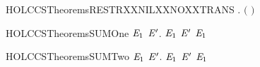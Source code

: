 \newcommand{\HOLCCSTheoremsRESTRXXLABELXXNOXXTRANS}{\UseVerbatim{HOLCCSTheoremsRESTRXXLABELXXNOXXTRANS}}
\begin{SaveVerbatim}{HOLCCSTheoremsRESTRXXNILXXNOXXTRANS}
\HOLTokenTurnstile{} \HOLSymConst{\HOLTokenForall{}}  . \HOLSymConst{\HOLTokenNeg{}}\ensuremath{(}   \HOLTokenTransBegin{}\HOLTokenTransEnd {}\ensuremath{)}
\end{SaveVerbatim}
\newcommand{\HOLCCSTheoremsRESTRXXNILXXNOXXTRANS}{\UseVerbatim{HOLCCSTheoremsRESTRXXNILXXNOXXTRANS}}
\begin{SaveVerbatim}{HOLCCSTheoremsSUMOne}
\HOLTokenTurnstile{} \HOLSymConst{\HOLTokenForall{}}  \ensuremath{\HOLBoundVar{E}\sb{\mathrm{1}}} \ensuremath{\HOLBoundVar{E}\sp{\prime}}.  \HOLTokenTransBegin{}\HOLTokenTransEnd \ensuremath{\HOLBoundVar{E}\sb{\mathrm{1}}} \HOLSymConst{\HOLTokenImp{}}  \HOLSymConst{\ensuremath{+}} \ensuremath{\HOLBoundVar{E}\sp{\prime}} \HOLTokenTransBegin{}\HOLTokenTransEnd \ensuremath{\HOLBoundVar{E}\sb{\mathrm{1}}}
\end{SaveVerbatim}
\newcommand{\HOLCCSTheoremsSUMOne}{\UseVerbatim{HOLCCSTheoremsSUMOne}}
\begin{SaveVerbatim}{HOLCCSTheoremsSUMTwo}
\HOLTokenTurnstile{} \HOLSymConst{\HOLTokenForall{}}  \ensuremath{\HOLBoundVar{E}\sb{\mathrm{1}}} \ensuremath{\HOLBoundVar{E}\sp{\prime}}.  \HOLTokenTransBegin{}\HOLTokenTransEnd \ensuremath{\HOLBoundVar{E}\sb{\mathrm{1}}} \HOLSymConst{\HOLTokenImp{}} \ensuremath{\HOLBoundVar{E}\sp{\prime}} \HOLSymConst{\ensuremath{+}}  \HOLTokenTransBegin{}\HOLTokenTransEnd \ensuremath{\HOLBoundVar{E}\sb{\mathrm{1}}}
\end{SaveVerbatim}
\newcommand{\HOLCCSTheoremsSUMTwo}{\UseVerbatim{HOLCCSTheoremsSUMTwo}}
